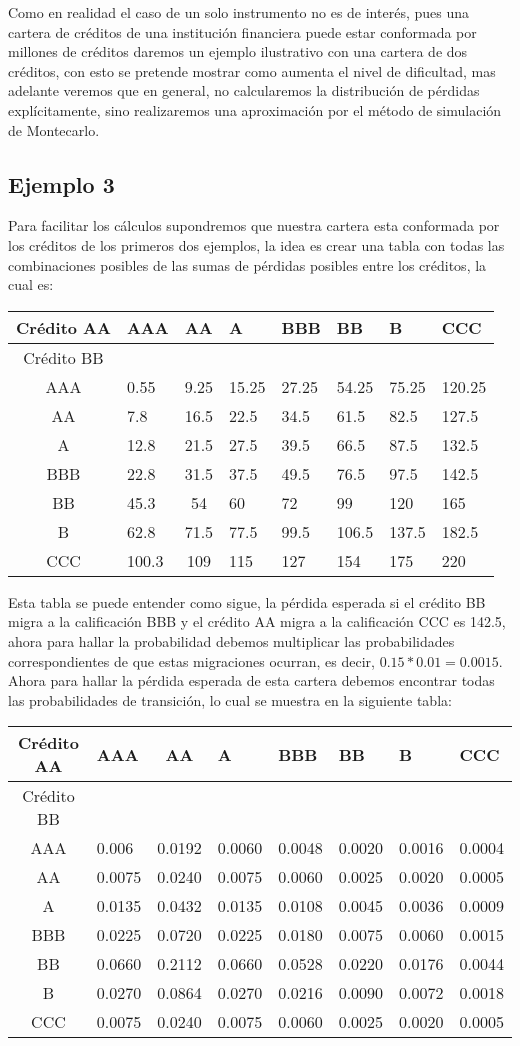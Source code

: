 \documentclass[
  12pt,
]{krantz}
\theoremstyle{definition}
\theoremstyle{definition}
\theoremstyle{definition}
\theoremstyle{remark}
\begin{document}
Como en realidad el caso de un solo instrumento no es de interés, pues una cartera de créditos de una institución financiera puede estar conformada por millones de créditos daremos un ejemplo ilustrativo con una cartera de dos créditos, con esto se pretende mostrar como aumenta el nivel de dificultad, mas adelante veremos que en general, no calcularemos la distribución de pérdidas explícitamente, sino realizaremos una aproximación por el método de simulación de Montecarlo.

\hypertarget{ejemplo-3}{%
\subsection{Ejemplo 3}\label{ejemplo-3}}

Para facilitar los cálculos supondremos que nuestra cartera esta conformada por los créditos de los primeros dos ejemplos, la idea es crear una tabla con todas las combinaciones posibles de las sumas de pérdidas posibles entre los créditos, la cual es:

\begin{longtable}[]{@{}clclllll@{}}
\toprule
Crédito AA & AAA & AA & A & BBB & BB & B & CCC\tabularnewline
\midrule
\endhead
Crédito BB & & & & & & &\tabularnewline
AAA & 0.55 & 9.25 & 15.25 & 27.25 & 54.25 & 75.25 & 120.25\tabularnewline
AA & 7.8 & 16.5 & 22.5 & 34.5 & 61.5 & 82.5 & 127.5\tabularnewline
A & 12.8 & 21.5 & 27.5 & 39.5 & 66.5 & 87.5 & 132.5\tabularnewline
BBB & 22.8 & 31.5 & 37.5 & 49.5 & 76.5 & 97.5 & 142.5\tabularnewline
BB & 45.3 & 54 & 60 & 72 & 99 & 120 & 165\tabularnewline
B & 62.8 & 71.5 & 77.5 & 99.5 & 106.5 & 137.5 & 182.5\tabularnewline
CCC & 100.3 & 109 & 115 & 127 & 154 & 175 & 220\tabularnewline
\bottomrule
\end{longtable}

Esta tabla se puede entender como sigue, la pérdida esperada si el crédito BB migra a la calificación BBB y el crédito AA migra a la calificación CCC es 142.5, ahora para hallar la probabilidad debemos multiplicar las probabilidades correspondientes de que estas migraciones ocurran, es decir, \(0.15*0.01=0.0015\). Ahora para hallar la pérdida esperada de esta cartera debemos encontrar todas las probabilidades de transición, lo cual se muestra en la siguiente tabla:

\begin{longtable}[]{@{}clclllll@{}}
\toprule
Crédito AA & AAA & AA & A & BBB & BB & B & CCC\tabularnewline
\midrule
\endhead
Crédito BB & & & & & & &\tabularnewline
AAA & 0.006 & 0.0192 & 0.0060 & 0.0048 & 0.0020 & 0.0016 & 0.0004\tabularnewline
AA & 0.0075 & 0.0240 & 0.0075 & 0.0060 & 0.0025 & 0.0020 & 0.0005\tabularnewline
A & 0.0135 & 0.0432 & 0.0135 & 0.0108 & 0.0045 & 0.0036 & 0.0009\tabularnewline
BBB & 0.0225 & 0.0720 & 0.0225 & 0.0180 & 0.0075 & 0.0060 & 0.0015\tabularnewline
BB & 0.0660 & 0.2112 & 0.0660 & 0.0528 & 0.0220 & 0.0176 & 0.0044\tabularnewline
B & 0.0270 & 0.0864 & 0.0270 & 0.0216 & 0.0090 & 0.0072 & 0.0018\tabularnewline
CCC & 0.0075 & 0.0240 & 0.0075 & 0.0060 & 0.0025 & 0.0020 & 0.0005\tabularnewline
\bottomrule
\end{longtable}
\end{document}

